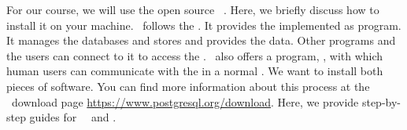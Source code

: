 %
%
\label{sec:installingPostgres}%
%
For our course, we will use the open source  \postgresql~\cite{TA2024DDAMWPAM,FP2023LP,OH2017PUAR,B2024PELUYDW}.
Here, we briefly discuss how to install it on your machine.
\postgresql\ follows the .
It provides the  implemented as  program.
It manages the databases and stores and provides the data.
Other programs and the users can connect to it to access the .
\postgresql\ also offers a  program, \psql, with which human users can communicate with the   in a normal .
We want to install both pieces of software.
You can find more information about this process at the \postgresql\ download page \url{https://www.postgresql.org/download}.
Here, we provide step-by-step guides for \ubuntu\ \linux\ and \microsoftWindows.%
%
%
%
%
\endhsection%
%

